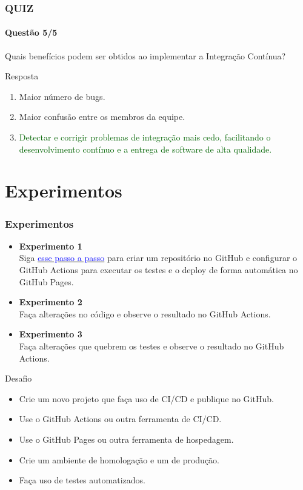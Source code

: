 \documentclass[
	9pt, %
	t, %
]{beamer}
\begin{document}
\begin{frame}
	\frametitle{QUIZ}
	\framesubtitle{Questão 5/5}

	{\Large Quais benefícios podem ser obtidos ao implementar a Integração Contínua? }

	\begin{exampleblock}{Resposta}
		\begin{enumerate}[a]
			\item Maior número de bugs.
			\item Maior confusão entre os membros da equipe.
			\item \textcolor{darkgreen}{Detectar e corrigir problemas de integração mais cedo, facilitando o desenvolvimento contínuo e a entrega de software de alta qualidade.}
		\end{enumerate}
	\end{exampleblock}

\end{frame}


\section{Experimentos}

\begin{frame}
	\frametitle{Experimentos}
	\begin{itemize}
		\item \textbf{Experimento 1}\\ Siga \href{https://github.com/fabricioifc/ci-cd-example/blob/main/README.md}{\textcolor{blue}{esse passo a passo}} para criar um repositório no GitHub e configurar o GitHub Actions para executar os testes e o deploy de forma automática no GitHub Pages.
		\item \textbf{Experimento 2}\\ Faça alterações no código e observe o resultado no GitHub Actions.
		\item \textbf{Experimento 3}\\ Faça alterações que quebrem os testes e observe o resultado no GitHub Actions.
	\end{itemize}

	\begin{block}{Desafio}
		\begin{itemize}
			\item Crie um novo projeto que faça uso de CI/CD e publique no GitHub.
			\item Use o GitHub Actions ou outra ferramenta de CI/CD.
			\item Use o GitHub Pages ou outra ferramenta de hospedagem.
			\item Crie um ambiente de homologação e um de produção. 
			\item Faça uso de testes automatizados.
		\end{itemize}

	\end{block}

\end{frame}
\end{document}

